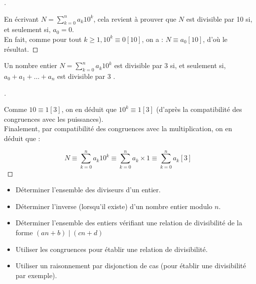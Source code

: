\documentclass[12pt]{article}
\newcommand{\hideM}[1]{#1}
\theoremstyle{break}
\newenvironment{demo}[1][\proofname]{%
  \begin{proof}[#1]$ $\newline
}{%
  \end{proof}
}
\begin{document}
\begin{demo}
    En écrivant $N=\sum_{k=0}^{n} a_{k} 10^{k}$, cela revient à prouver que $N$ est divisible par 10 si, et seulement si, $a_{0}=0$.\\
    En fait, comme pour tout $k \geqslant 1,10^{k} \equiv 0[10]$, on a : $N \equiv a_{0}[10]$, d'où le résultat.
\end{demo}

\begin{proposition}{}{}
    Un nombre entier $N=\sum_{k=0}^{n} a_{k} 10^{k}$ est divisible par 3 si, et seulement si, $\hideM{a_{0}+a_{1}+\ldots+a_{n}}$ est divisible par 3 .
\end{proposition}

\begin{demo}
    Comme $10 \equiv 1[3]$, on en déduit que $10^{k} \equiv 1[3]$ (d'après la compatibilité des congruences avec les puissances).\\
    Finalement, par compatibilité des congruences avec la multiplication, on en déduit que :
    
    $$
    N \equiv \sum_{k=0}^{n} a_{k} 10^{k} \equiv \sum_{k=0}^{n} a_{k} \times 1 \equiv \sum_{k=0}^{n} a_{k}[3]
    $$
\end{demo}

\begin{savoir}{}{}
    \begin{itemize}[noitemsep,topsep=0pt]
      \item Déterminer l'ensemble des diviseurs d'un entier.
      \item Déterminer l'inverse (lorsqu'il existe) d'un nombre entier modulo $n$.
      \item Déterminer l'ensemble des entiers vérifiant une relation de divisibilité de la forme $(a n+b) \mid(c n+d)$
      \item Utiliser les congruences pour établir une relation de divisibilité.
      \item Utiliser un raisonnement par disjonction de cas (pour établir une divisibilité par exemple).
    \end{itemize}
\end{savoir}
\end{document}
